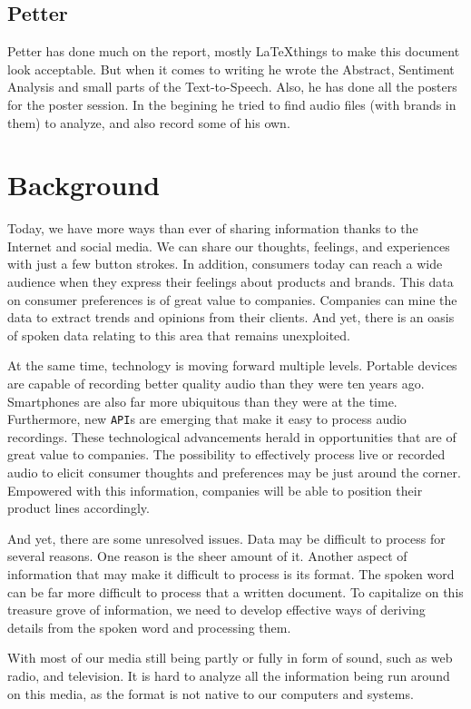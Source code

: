 \documentclass[a4paper,12pt,twoside]{ltxdoc}
\begin{document}
\subsection{Petter}
Petter has done much on the report, mostly \LaTeX things to make this document look acceptable. But when it comes to writing he wrote the Abstract, Sentiment Analysis and small parts of the Text-to-Speech.  Also, he has done all the posters for the poster session. In the begining he tried to find audio files (with brands in them) to analyze, and also record some of his own.

\newpage
\section{Background}
Today, we have more ways than ever of sharing information thanks to the Internet and social media. We can share our
thoughts, feelings, and experiences with just a few button strokes. In addition, consumers today can reach a wide audience
when they express their feelings about products and brands. This data on consumer preferences is of great value to companies.
Companies can mine the data to extract trends and opinions from their clients. And yet, there is an oasis of spoken
data relating to this area that remains unexploited.

At the same time, technology is moving forward multiple levels. Portable devices are capable of recording better quality
audio than they were ten years ago. Smartphones are also far more ubiquitous than they were at the time.
Furthermore, new \verb#API#s are emerging that make it easy to process audio recordings. These technological advancements herald
in opportunities that are of great value to companies. The possibility to effectively process live or recorded audio
to elicit consumer thoughts and preferences may be just around the corner. Empowered with this information, companies will
be able to position their product lines accordingly.

And yet, there are some unresolved issues. Data may be difficult to process for several reasons. One reason is the sheer
amount of it. Another aspect of information that may make it difficult to process is its format. The spoken word can be 
far more difficult to process that a written document. To capitalize on this treasure grove of information, we need
to develop effective ways of deriving details from the spoken word and processing them.

With most of our media still being partly or fully in form of sound, such  as web radio, and television.
It is hard to analyze all the information being run around on this media, as the format is not
native to our computers and systems. 
\end{document}
